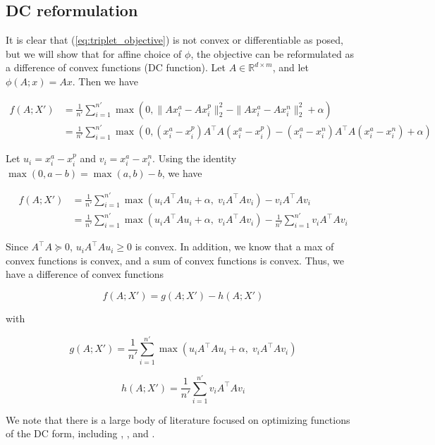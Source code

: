 \documentclass[11pt]{article}
\begin{document}
\subsection{DC reformulation}

It is clear that (\ref{eq:triplet_objective}) is not convex or differentiable as posed, but we will show that for affine choice of $\phi$, the objective can be reformulated as a difference of convex functions (DC function). Let $A \in \mathbb{R}^{d \times m}$, and let $\phi(A; x) = Ax$. Then we have

\begin{align*}
    f(A; X') &= \frac{1}{n'} \sum_{i=1}^{n'} \max(0, \| Ax_i^a - Ax_i^p\|_2^2 - \| Ax_i^a - Ax_i^n \|_2^2 + \alpha) \\
    &= \frac{1}{n'} \sum_{i=1}^{n'} \max(0, (x_i^a - x_i^p)A^{\top}A(x_i^a - x_i^p) - (x_i^a - x_i^n)A^{\top}A(x_i^a - x_i^n) + \alpha) 
\end{align*}

Let $u_i = x_i^a - x_i^p$ and $v_i = x_i^a - x_i^n$. Using the identity $\max(0, a - b) = \max(a, b) - b$, we have

\begin{align*}
    f(A; X') &= \frac{1}{n'} \sum_{i=1}^{n'} \max(u_i A^{\top}Au_i + \alpha, \; v_i A^{\top}A v_i) - v_i A^{\top}A v_i \\
    &= \frac{1}{n'} \sum_{i=1}^{n'} \max(u_i A^{\top}Au_i + \alpha, \; v_i A^{\top}A v_i) - \frac{1}{n'} \sum_{i=1}^{n'} v_i A^{\top}A v_i
\end{align*}

Since $A^{\top}A \succeq 0$, \; $u_i A^{\top}Au_i \geq 0$ is convex. In addition, we know that a max of convex functions is convex, and a sum of convex functions is convex. Thus, we have a difference of convex functions

\begin{equation}
    f(A; X') = g(A; X') - h(A; X')
\end{equation}

with

\begin{equation}
    g(A; X') = \frac{1}{n'} \sum_{i=1}^{n'} \max(u_i A^{\top}Au_i + \alpha, \; v_i A^{\top}A v_i)
\end{equation}

\begin{equation}
    h(A; X') = \frac{1}{n'} \sum_{i=1}^{n'} v_i A^{\top}A v_i
\end{equation}

We note that there is a large body of literature focused on optimizing functions of the DC form, including \cite{an_dc_2005}, \cite{lipp_variations_2016}, and \cite{khamaru_convergence_2018}.
\end{document}

